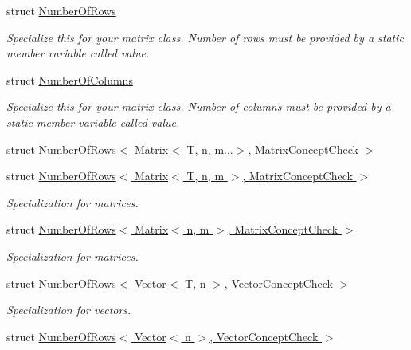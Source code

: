 \begin{DoxyCompactItemize}
struct \hyperlink{structFunG_1_1LinearAlgebra_1_1NumberOfRows}{\-Number\-Of\-Rows}
\begin{DoxyCompactList}\small\item\em \-Specialize this for your matrix class. \-Number of rows must be provided by a static member variable called value. \end{DoxyCompactList}\item 
struct \hyperlink{structFunG_1_1LinearAlgebra_1_1NumberOfColumns}{\-Number\-Of\-Columns}
\begin{DoxyCompactList}\small\item\em \-Specialize this for your matrix class. \-Number of columns must be provided by a static member variable called value. \end{DoxyCompactList}\item 
struct \hyperlink{structFunG_1_1LinearAlgebra_1_1NumberOfRows_3_01Matrix_3_01T_00_01n_00_01m_8_8_8_4_00_01MatrixConceptCheck_01_4}{\-Number\-Of\-Rows$<$ Matrix$<$ T, n, m...$>$, Matrix\-Concept\-Check $>$}
\item 
struct \hyperlink{structFunG_1_1LinearAlgebra_1_1NumberOfRows_3_01Matrix_3_01T_00_01n_00_01m_01_4_00_01MatrixConceptCheck_01_4}{\-Number\-Of\-Rows$<$ Matrix$<$ T, n, m $>$, Matrix\-Concept\-Check $>$}
\begin{DoxyCompactList}\small\item\em \-Specialization for matrices. \end{DoxyCompactList}\item 
struct \hyperlink{structFunG_1_1LinearAlgebra_1_1NumberOfRows_3_01Matrix_3_01n_00_01m_01_4_00_01MatrixConceptCheck_01_4}{\-Number\-Of\-Rows$<$ Matrix$<$ n, m $>$, Matrix\-Concept\-Check $>$}
\begin{DoxyCompactList}\small\item\em \-Specialization for matrices. \end{DoxyCompactList}\item 
struct \hyperlink{structFunG_1_1LinearAlgebra_1_1NumberOfRows_3_01Vector_3_01T_00_01n_01_4_00_01VectorConceptCheck_01_4}{\-Number\-Of\-Rows$<$ Vector$<$ T, n $>$, Vector\-Concept\-Check $>$}
\begin{DoxyCompactList}\small\item\em \-Specialization for vectors. \end{DoxyCompactList}\item 
struct \hyperlink{structFunG_1_1LinearAlgebra_1_1NumberOfRows_3_01Vector_3_01n_01_4_00_01VectorConceptCheck_01_4}{\-Number\-Of\-Rows$<$ Vector$<$ n $>$, Vector\-Concept\-Check $>$}

\end{DoxyCompactItemize}
